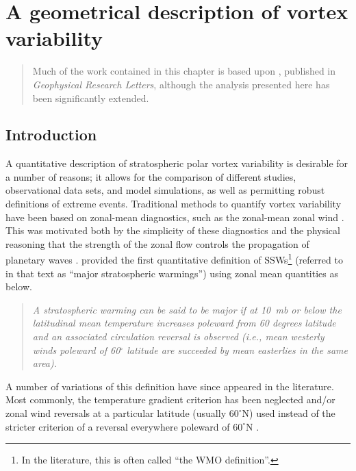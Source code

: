 \chapter{A geometrical description of vortex variability}
\begin{quotation}
  Much of the work contained in this chapter is based upon \citet{Seviour2013},
  published in \emph{Geophysical Research Letters}, although the analysis
  presented here has been significantly extended.
\end{quotation}

\label{cha:moments}




\section{Introduction}
\label{sec:moments-introduction}
A quantitative description of stratospheric polar vortex variability is
desirable for a number of reasons; it allows for the comparison of different
studies, observational data sets, and model simulations, as well as permitting
robust definitions of extreme events.  Traditional methods to quantify vortex
variability have been based on zonal-mean diagnostics, such as the zonal-mean
zonal wind \citep[e.g.,][]{Andrews1987}. This was motivated both by the
simplicity of these diagnostics and the physical reasoning that the strength of
the zonal flow controls the propagation of planetary waves \citep[][Section
\ref{sec:plan-waves-strat}]{Charney1961}. \citet{McInturff1978} provided the
first quantitative definition of SSWs\footnote{In the literature, this is often
  called ``the WMO definition''.} (referred to in that text as ``major
stratospheric warmings'') using zonal mean quantities as below.
\begin{quotation}
\emph{A stratospheric warming can be said to be major if at 10~mb or below the
latitudinal mean temperature increases poleward from 60 degrees latitude and an
associated circulation reversal is observed (i.e., mean westerly winds poleward
of 60$^{\circ}$ latitude are succeeded by mean easterlies in the same area).}
\end{quotation}
A number of variations of this definition have since appeared in the
literature. Most commonly, the temperature gradient criterion has been neglected
and/or zonal wind reversals at a particular latitude (usually $60^{\circ}$N)
used instead of the stricter criterion of a reversal everywhere poleward of
$60^{\circ}$N \citep[e.g.,][]{Labitzke2000, Christiansen2001,
  Reichler2012}. 

